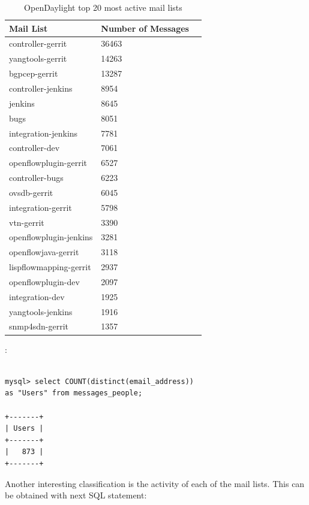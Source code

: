 \documentclass[a4paper, 12pt]{book}
\begin{document}
\begin{table}[H]
\footnotesize
\begin{center}
\begin{tabular}{|l|l|p{3cm}|}
\hline
\textbf{Mail List} & \textbf{Number of Messages} \\ \hline
controller-gerrit & 36463 \\ \hline
yangtools-gerrit & 14263 \\ \hline
bgpcep-gerrit & 13287 \\ \hline
controller-jenkins & 8954 \\ \hline
jenkins & 8645 \\ \hline
bugs & 8051 \\ \hline
integration-jenkins & 7781 \\ \hline
controller-dev & 7061 \\ \hline
openflowplugin-gerrit & 6527 \\ \hline
controller-bugs & 6223 \\ \hline
ovsdb-gerrit & 6045 \\ \hline
integration-gerrit & 5798 \\ \hline
vtn-gerrit & 3390 \\ \hline
openflowplugin-jenkins & 3281 \\ \hline
openflowjava-gerrit & 3118 \\ \hline
lispflowmapping-gerrit & 2937 \\ \hline
openflowplugin-dev & 2097 \\ \hline
integration-dev & 1925 \\ \hline
yangtools-jenkins & 1916 \\ \hline
snmp4sdn-gerrit & 1357 \\ \hline
\end{tabular}
\end{center}
\caption{OpenDaylight top 20 most active mail lists}
\label{tab:odl_top_maillists}
\end{table}

:

\begin{verbatim}

mysql> select COUNT(distinct(email_address))
as "Users" from messages_people;

+-------+
| Users |
+-------+
|   873 |
+-------+

\end{verbatim}
Another interesting classification is the activity of each of the mail lists. This can be obtained with next SQL statement:
\end{document}
